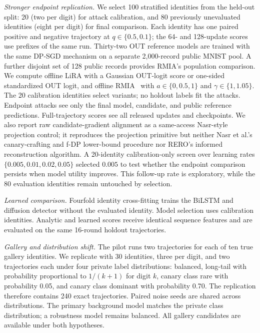 \documentclass[conference]{IEEEtran}
\begin{document}
\emph{Stronger endpoint replication.} We select 100 stratified identities from the held-out split: 20 (two per digit) for attack calibration, and 80 previously unevaluated identities (eight per digit) for final comparison. Each identity has one paired positive and negative trajectory at $q\in\{0.5,0.1\}$; the 64- and 128-update scores use prefixes of the same run. Thirty-two OUT reference models are trained with the same DP-SGD mechanism on a separate 2,000-record public MNIST pool. A further disjoint set of 128 public records provides RMIA's population comparison. We compute offline LiRA with a Gaussian OUT-logit score or one-sided standardized OUT logit, and offline RMIA~\cite{carlini2022membership,zarifzadeh2024lowcost} with $a\in\{0,0.5,1\}$ and $\gamma\in\{1,1.05\}$. The 20 calibration identities select variants; no holdout labels fit the attacks. Endpoint attacks see only the final model, candidate, and public reference predictions. Full-trajectory scores see all released updates and checkpoints. We also report raw candidate-gradient alignment as a same-access Nasr-style projection control; it reproduces the projection primitive but neither Nasr et al.'s canary-crafting and f-DP lower-bound procedure nor RERO's informed reconstruction algorithm. A 20-identity calibration-only screen over learning rates $\{0.005,0.01,0.02,0.05\}$ selected $0.005$ to test whether the endpoint comparison persists when model utility improves. This follow-up rate is exploratory, while the 80 evaluation identities remain untouched by selection.

\emph{Learned comparison.} Fourfold identity cross-fitting trains the BiLSTM and diffusion detector without the evaluated identity. Model selection uses calibration identities. Analytic and learned scores receive identical sequence features and are evaluated on the same 16-round holdout trajectories.

\emph{Gallery and distribution shift.} The pilot runs two trajectories for each of ten true gallery identities. We replicate with 30 identities, three per digit, and two trajectories each under four private label distributions: balanced, long-tail with probability proportional to $1/(k+1)$ for digit $k$, canary class rare with probability 0.05, and canary class dominant with probability 0.70. The replication therefore contains 240 exact trajectories. Paired noise seeds are shared across distributions. The primary background model matches the private class distribution; a robustness model remains balanced. All gallery candidates are available under both hypotheses.
\end{document}
